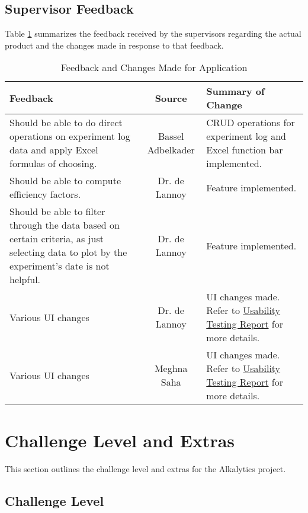 \documentclass{article}
\begin{document}
\subsection{Supervisor Feedback}
Table \ref{table:Code} summarizes the feedback received by the supervisors
regarding the actual product and the changes made in response to that feedback.
\begin{table}[H]
\centering
\begin{tabularx}{\textwidth}{|X|c|X|}
    \hline
    \textbf{Feedback} & \textbf{Source} & \textbf{Summary of Change} \\
    \hline
    Should be able to do direct operations on experiment log data and apply
    Excel formulas of choosing. & Bassel Adbelkader & CRUD operations for
    experiment log and Excel function bar implemented. \\
    \hline
    Should be able to compute efficiency factors. & Dr. de Lannoy & Feature
    implemented. \\
    \hline
    Should be able to filter through the data based on certain criteria, as just
    selecting data to plot by the experiment's date is not helpful. & Dr. de
    Lannoy & Feature implemented. \\
    \hline
    Various UI changes & Dr. de Lannoy & UI changes made. Refer to
    \href{https://github.com/SumanyaG/Alkalytics/blob/main/docs/UsabilityTestingReport/UsabilityTestingReport.pdf}{Usability
    Testing Report} for more details. \\
    \hline
    Various UI changes & Meghna Saha & UI changes made. Refer to
    \href{https://github.com/SumanyaG/Alkalytics/blob/main/docs/UsabilityTestingReport/UsabilityTestingReport.pdf}{Usability
    Testing Report} for more details. \\
    \hline
\end{tabularx}
\caption{Feedback and Changes Made for Application}
\label{table:Code}
\end{table}

\section{Challenge Level and Extras}
This section outlines the challenge level and extras for the Alkalytics project.

\subsection{Challenge Level}
\end{document}
